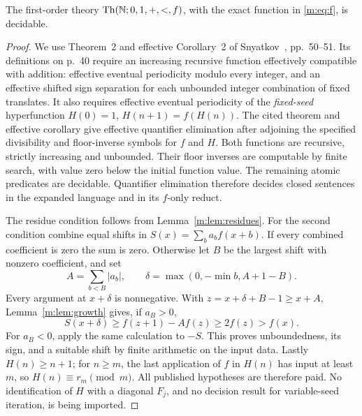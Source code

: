 \begin{theorem}\label{m:thm:snyatkov}
The first-order theory $\operatorname{Th}(\mathbb N;0,1,+,<,f)$, with the exact
function in \eqref{m:eq:f}, is decidable.
\end{theorem}
\begin{proof}
We use Theorem~2 and effective Corollary~2 of Snyatkov~\cite{snyatkov},
pp.~50--51. Its definitions on p.~40 require an increasing recursive
function effectively compatible with addition: effective eventual periodicity
modulo every integer, and an effective shifted sign separation for each
unbounded integer combination of fixed translates. It also requires effective
eventual periodicity of the \emph{fixed-seed} hyperfunction
$H(0)=1$, $H(n+1)=f(H(n))$. The cited theorem and effective corollary
give effective quantifier elimination after adjoining the specified
divisibility and floor-inverse symbols for $f$ and $H$.  Both functions
are recursive, strictly increasing and unbounded.  Their floor inverses
are computable by finite search, with value zero below the initial
function value.  The remaining atomic predicates are decidable.
Quantifier elimination therefore decides closed sentences in the
expanded language and in its $f$-only reduct.

The residue condition follows from Lemma~\ref{m:lem:residues}. For the second
condition combine equal shifts in $S(x)=\sum_b a_b f(x+b)$. If every
combined coefficient is zero the sum is zero. Otherwise let $B$ be the
largest shift with nonzero coefficient, and set
\[
 A=\sum_{b<B}|a_b|,\qquad
 \delta=\max(0,-\min b,A+1-B).
\]
Every argument at $x+\delta$ is nonnegative. With
$z=x+\delta+B-1\ge x+A$, Lemma~\ref{m:lem:growth} gives, if $a_B>0$,
\[
 S(x+\delta)\ge f(z+1)-Af(z)\ge2f(z)>f(x).
\]
For $a_B<0$, apply the same calculation to $-S$. This proves unboundedness,
its sign, and a suitable shift by finite arithmetic on the input data.
Lastly $H(n)\ge n+1$; for $n\ge m$, the last application of $f$ in
$H(n)$ has input at least $m$, so $H(n)\equiv r_m\pmod m$.
All published hypotheses are therefore paid. No identification of $H$ with
a diagonal $F_j$, and no decision result for variable-seed iteration, is
being imported.
\end{proof}


